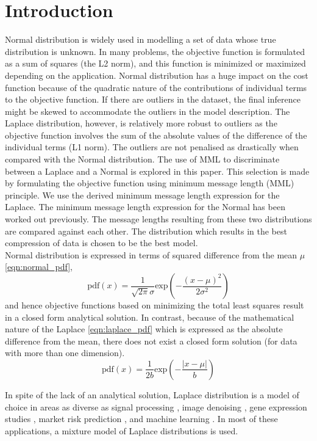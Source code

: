 \documentclass[wcp]{jmlr}
\begin{document}
\section{Introduction}
Normal distribution is widely used in modelling a set of data whose true distribution
is unknown. In many problems, the objective function is formulated as a sum of squares
(the L2 norm), and this function is minimized or maximized depending on the application. 
Normal distribution has a huge impact on the cost function because of the quadratic nature of 
the contributions of individual terms to the objective function. If there are 
outliers in the dataset, the final 
inference might be skewed to accommodate the outliers in the model description. 
The Laplace distribution, however, is relatively more robust to
outliers as the objective function involves the sum of the absolute values of the difference 
of the individual terms (L1 norm). The outliers are not penalised as drastically
when compared with the Normal distribution.
The use of MML to discriminate between a Laplace and a Normal is explored in this paper. 
This selection is made by formulating the objective function using minimum message
length (MML) principle. We use the derived minimum message length expression for the Laplace.
The minimum message length expression for the Normal has been worked out previously. 
The message lengths resulting from these two distributions are compared against
each other. The distribution which results in the best compression of data is chosen
to be the best model. \\

Normal distribution is expressed in terms of squared difference from the mean $\mu$
\eqref{eqn:normal_pdf},
\begin{equation}
\mathrm{pdf}(x) = \frac{1}{\sqrt{2\pi}\sigma} \mathrm{exp}\left(-\frac{(x-\mu)^2}{2\sigma^2}\right) \label{eqn:normal_pdf}
\end{equation}
and hence objective functions based on minimizing the total least squares result in a 
closed form analytical solution. In contrast, because of the mathematical
nature of the Laplace \eqref{eqn:laplace_pdf} which is expressed as the absolute 
difference from the mean, there does not exist a closed form solution 
(for data with more than one dimension).
\begin{equation}
\mathrm{pdf}(x) = \frac{1}{2b}\mathrm{exp}\left(-\frac{|x-\mu|}{b}\right) \label{eqn:laplace_pdf}
\end{equation}

In spite of the lack of an analytical solution, Laplace distribution
is a model of choice in areas as diverse as signal processing 
\citep{laplace-signal-processing}, image denoising \citep{image-denoising},
gene expression studies \citep{Bhowmick01102006}, market risk prediction
\citep{haas2005modeling}, and machine learning \citep{Cord:2006:FSR:1167556.1167570}.
In most of these applications, a mixture model of Laplace distributions is used. \\
\end{document}
